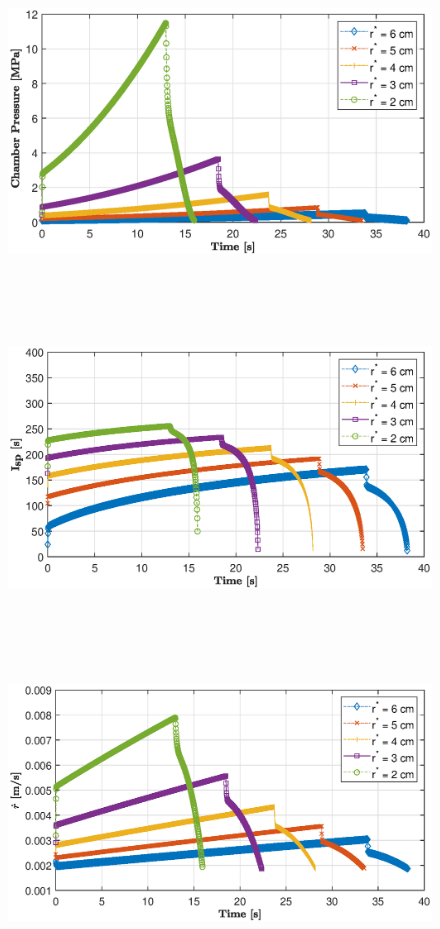 \documentclass[letterpaper,12pt]{article}
\begin{document}
\begin{figure} [!h]
	\centering
	\includegraphics[height = 8.4cm]{graphs/q2_pc.eps}
\end{figure}
\begin{figure} [!h]
	\centering
	\includegraphics[height = 8.4cm]{graphs/q2_isp.eps}
\end{figure}
\begin{figure} [!h]
	\centering
	\includegraphics[height = 8.4cm]{graphs/q2_rdot.eps}
\end{figure}

\end{document}

